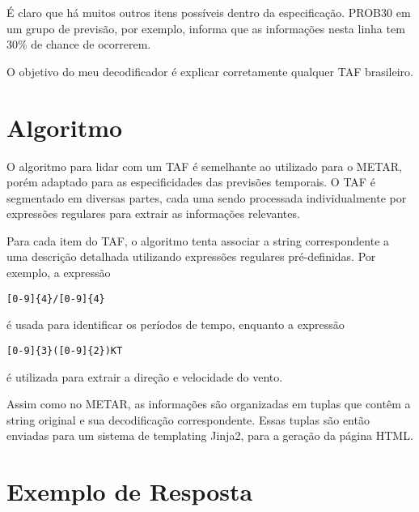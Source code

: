 É claro que há muitos outros itens possíveis dentro da especificação. PROB30 em 
um grupo de previsão, por exemplo, informa que as informações nesta linha tem 
30\% de chance de ocorrerem.

O objetivo do meu decodificador é explicar corretamente qualquer TAF brasileiro.


\section{Algoritmo}

O algoritmo para lidar com um TAF é semelhante ao utilizado para o METAR, porém adaptado
para as especificidades das previsões temporais. O TAF é segmentado em diversas
partes, cada uma sendo processada individualmente por expressões regulares para extrair as
informações relevantes.

Para cada item do TAF, o algoritmo tenta associar a string correspondente a uma descrição
detalhada utilizando expressões regulares pré-definidas. Por exemplo, a expressão

\begin{verbatim}
[0-9]{4}/[0-9]{4} 
\end{verbatim}

é usada para identificar os períodos de tempo, enquanto a expressão

\begin{verbatim}
[0-9]{3}([0-9]{2})KT
\end{verbatim}

é utilizada para extrair a direção e velocidade do vento.

Assim como no METAR, as informações são organizadas em tuplas que contêm a string original
e sua decodificação correspondente. Essas tuplas são então enviadas para um sistema de
templating Jinja2, para a geração da página HTML.

\section{Exemplo de Resposta}

